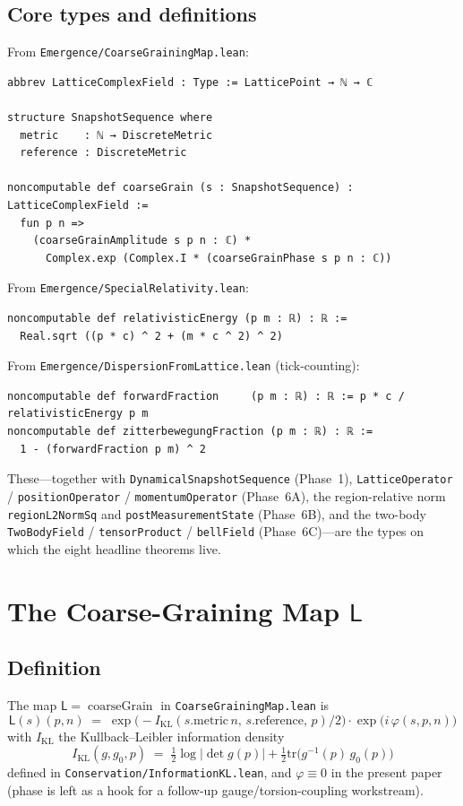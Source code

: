 \documentclass[11pt,a4paper,twoside]{article}
\theoremstyle{definition}
\newcommand{\KL}{I_{\mathrm{KL}}}
\newcommand{\Lmap}{\mathsf{L}}
\newcommand{\coarseGrain}{\operatorname{coarseGrain}}
\newcommand{\code}[1]{\texttt{#1}}
\begin{document}
\subsection{Core types and definitions}\label{sec:setup-types}

From \code{Emergence/CoarseGrainingMap.lean}:
\begin{lstlisting}
abbrev LatticeComplexField : Type := LatticePoint → ℕ → ℂ

structure SnapshotSequence where
  metric    : ℕ → DiscreteMetric
  reference : DiscreteMetric

noncomputable def coarseGrain (s : SnapshotSequence) : LatticeComplexField :=
  fun p n =>
    (coarseGrainAmplitude s p n : ℂ) *
      Complex.exp (Complex.I * (coarseGrainPhase s p n : ℂ))
\end{lstlisting}

From \code{Emergence/SpecialRelativity.lean}:
\begin{lstlisting}
noncomputable def relativisticEnergy (p m : ℝ) : ℝ :=
  Real.sqrt ((p * c) ^ 2 + (m * c ^ 2) ^ 2)
\end{lstlisting}

From \code{Emergence/DispersionFromLattice.lean} (tick-counting):
\begin{lstlisting}
noncomputable def forwardFraction     (p m : ℝ) : ℝ := p * c / relativisticEnergy p m
noncomputable def zitterbewegungFraction (p m : ℝ) : ℝ :=
  1 - (forwardFraction p m) ^ 2
\end{lstlisting}

These---together with \code{DynamicalSnapshotSequence} (Phase~1),
\code{LatticeOperator} / \code{positionOperator} /
\code{momentumOperator} (Phase~6A), the region-relative norm
\code{regionL2NormSq} and \code{postMeasurementState} (Phase~6B), and
the two-body \code{TwoBodyField} / \code{tensorProduct} /
\code{bellField} (Phase~6C)---are the types on which the eight
headline theorems live.

\section{The Coarse-Graining Map \texorpdfstring{$\Lmap$}{L}}\label{sec:coarsegrain}

\subsection{Definition}\label{sec:coarsegrain-def}

The map $\Lmap=\coarseGrain$ in \code{CoarseGrainingMap.lean} is
\[
\Lmap(s)(p,n)
 \;=\; \exp\!\bigl(-\KL(s.\mathrm{metric}\,n,\,s.\mathrm{reference},\,p)/2\bigr)\cdot
       \exp\!\bigl(i\,\varphi(s,p,n)\bigr)
\]
with $\KL$ the Kullback--Leibler information density
\[
\KL(g,g_{0},p)\;=\;\tfrac{1}{2}\log|\det g(p)|
                    +\tfrac{1}{2}\mathrm{tr}\bigl(g^{-1}(p)\,g_{0}(p)\bigr)
\]
defined in \code{Conservation/InformationKL.lean}, and $\varphi\equiv 0$
in the present paper (phase is left as a hook for a follow-up
gauge/torsion-coupling workstream).
\end{document}
